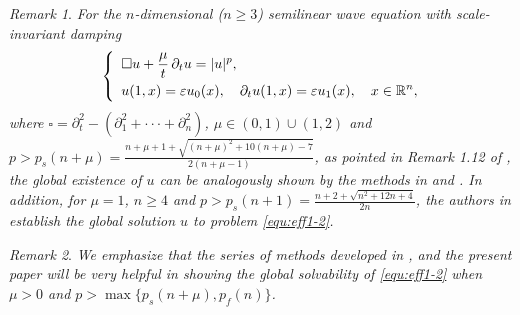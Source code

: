 \documentclass[11pt,twoside]{article}
\newcommand{\p}{\partial}
\newcommand{\ve}{\varepsilon}
\newcommand{\f}{\frac}
\theoremstyle{plain}
\theoremstyle{definition}
\theoremstyle{remark}
\newtheorem{remark}{Remark}[section]
\numberwithin{equation}{section}
\begin{document}
\begin{remark}\label{RE-2}
{\it For the $n$-dimensional ($n\ge3$) semilinear wave equation with scale-invariant  damping
\begin{equation}\label{equ:eff1-2}
\left\{ \enspace
\begin{aligned}
&\square u +\f{\mu}{t}\,\p_tu=|u|^p, \\
&u(1,x)=\ve u_0(x), \quad \partial_{t} u(1,x)=\ve u_1(x),\quad x\in\Bbb R^n,
\end{aligned}
\right.
\end{equation}
where $\square=\partial_t^2-(\p_1^2+\cdot\cdot\cdot+\p_n^2)$, $\mu\in (0,1)\cup (1,2)$ and $p>p_s(n+\mu)=\f{n+\mu+1+\sqrt{(n+\mu)^2+10(n+\mu)-7}}{2(n+\mu-1)}$,
as pointed in Remark 1.12 of \cite{HLWY}, the global existence
of $u$ can be analogously shown by the methods in \cite{LWY} and \cite{HLWY}.
In addition, for $\mu=1$, $n\ge 4$ and $p>p_s(n+1)=\f{n+2+\sqrt{n^2+12n+4}}{2n}$,
the authors in \cite{HL} establish the global solution $u$ to problem \eqref{equ:eff1-2}.}
\end{remark}


\begin{remark}\label{RE-3}
{\it We emphasize that the series of methods developed in \cite{LWY}, \cite{HLWY}
and the present paper will be very helpful in showing the global solvability of
\eqref{equ:eff1-2} when $\mu>0$ and $p>\max\{p_s(n+\mu), p_f(n)\}$.}
\end{remark}
\end{document}
